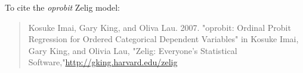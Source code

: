 To cite the \emph{ oprobit } Zelig model:
 \begin{verse}
 Kosuke Imai, Gary King, and Oliva Lau. 2007. "oprobit: Ordinal Probit Regression for Ordered Categorical Dependent Variables" in Kosuke Imai, Gary King, and Olivia Lau, "Zelig: Everyone's Statistical Software,"\url{http://gking.harvard.edu/zelig} 
\end{verse}